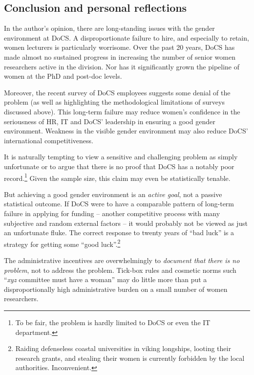 \documentclass[a4paper,10pt,twocolumn]{article}
\begin{document}
\subsection*{Conclusion and personal reflections}

In the author's opinion, there are long-standing issues with the
gender environment at DoCS.  A disproportionate failure to hire, and
especially to retain, women lecturers is particularly worrisome.  Over
the past 20 years, DoCS has made almost no sustained progress in
increasing the number of senior women researchers active in the
division.  Nor has it significantly grown the pipeline of women at the
PhD and post-doc levels.

Moreover, the recent survey of DoCS employees suggests some denial of
the problem (as well as highlighting the methodological limitations of
surveys discussed above).  This long-term failure may reduce women's
confidence in the seriousness of HR, IT and DoCS' leadership in
ensuring a good gender environment.  Weakness in the visible gender
environment may also reduce DoCS' international competitiveness.

It is naturally tempting to view a sensitive and challenging problem
as simply unfortunate or to argue that there is no proof that DoCS has
a notably poor record.\footnote{To be fair, the problem is hardly
limited to DoCS or even the IT department.}  Given the sample size,
this claim may even be statistically tenable.


But achieving a good gender environment is an \emph{active goal}, not
a passive statistical outcome.  If DoCS were to have a comparable
pattern of long-term failure in applying for funding -- another
competitive process with many subjective and random external factors
-- it would probably not be viewed as just an unfortunate fluke.  The
correct response to twenty years of ``bad luck'' is a strategy for
getting some ``good luck''.\footnote{Raiding defenseless coastal
 universities in viking longships, looting their
 research grants, and stealing their women is currently
 forbidden by the local authorities.
Inconvenient.}

The administrative incentives are overwhelmingly to \emph{document
that there is no problem}, not to address the problem.  Tick-box rules
and cosmetic norms such ``\emph{xyz} committee must have a woman'' may
do little more than put a disproportionally high administrative burden
on a small number of women researchers.
\end{document}
